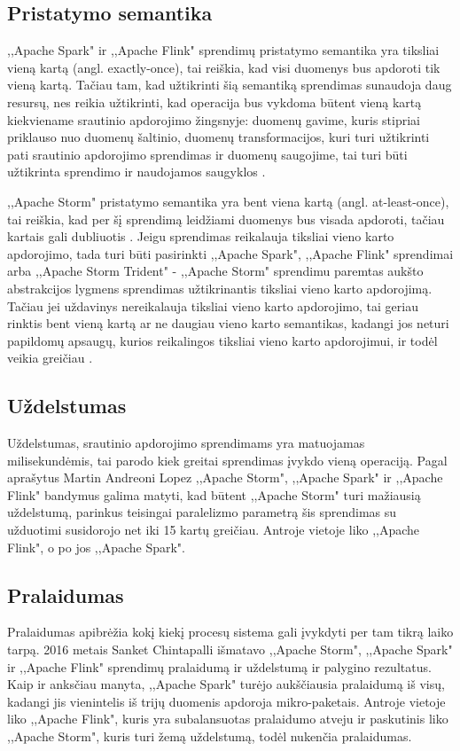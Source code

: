 \documentclass{VUMIFPSkursinis}
\begin{document}
\subsection{Pristatymo semantika}
,,Apache Spark" ir ,,Apache Flink" sprendimų pristatymo semantika yra tiksliai vieną kartą (angl. exactly-once), tai reiškia, kad visi 
duomenys bus apdoroti tik vieną kartą. Tačiau tam, kad užtikrinti šią semantiką sprendimas sunaudoja daug resursų, nes reikia užtikrinti, kad 
operacija bus vykdoma būtent vieną kartą kiekviename srautinio apdorojimo žingsnyje: duomenų gavime, kuris stipriai priklauso nuo duomenų šaltinio,
duomenų transformacijos, kuri turi užtikrinti pati srautinio apdorojimo sprendimas ir duomenų saugojime, tai turi būti užtikrinta sprendimo ir
naudojamos saugyklos \cite{zhang20}.\par
    ,,Apache Storm" pristatymo semantika yra bent viena kartą (angl. at-least-once), tai reiškia, kad per šį sprendimą leidžiami duomenys 
bus visada apdoroti, tačiau kartais gali dubliuotis \cite{prithi20}. Jeigu sprendimas reikalauja tiksliai vieno karto apdorojimo, tada turi būti pasirinkti
,,Apache Spark", ,,Apache Flink" sprendimai arba ,,Apache Storm Trident" - ,,Apache Storm" sprendimu paremtas aukšto abstrakcijos lygmens sprendimas 
užtikrinantis tiksliai vieno karto apdorojimą. Tačiau jei uždavinys nereikalauja tiksliai vieno karto apdorojimo, tai geriau
rinktis bent vieną kartą ar ne daugiau vieno karto semantikas, kadangi jos neturi papildomų apsaugų, kurios reikalingos tiksliai vieno karto apdorojimui,
ir todėl veikia greičiau \cite{zhang20}.
\subsection{Uždelstumas}
    Uždelstumas, srautinio apdorojimo sprendimams yra matuojamas milisekundėmis, tai parodo kiek greitai sprendimas įvykdo vieną operaciją. 
Pagal \cite{Lopez2016APC} aprašytus Martin Andreoni Lopez ,,Apache Storm", ,,Apache Spark" ir ,,Apache Flink" bandymus galima matyti, kad būtent ,,Apache Storm" turi mažiausią uždelstumą,
parinkus teisingai paralelizmo parametrą šis sprendimas su užduotimi susidorojo net iki 15 kartų greičiau. Antroje vietoje liko ,,Apache Flink", o po jos
,,Apache Spark".

\subsection{Pralaidumas}
Pralaidumas apibrėžia kokį kiekį procesų sistema gali įvykdyti per tam tikrą laiko tarpą. 2016 metais Sanket Chintapalli \cite{chintapalli2016benchmarking} išmatavo ,,Apache Storm",
,,Apache Spark" ir ,,Apache Flink" sprendimų pralaidumą ir uždelstumą ir palygino rezultatus. Kaip ir anksčiau manyta, ,,Apache Spark" turėjo aukščiausia 
pralaidumą iš visų, kadangi jis vienintelis iš trijų duomenis apdoroja mikro-paketais. Antroje vietoje liko ,,Apache Flink", kuris yra subalansuotas
pralaidumo atveju ir paskutinis liko ,,Apache Storm", kuris turi žemą uždelstumą, todėl nukenčia pralaidumas.
\end{document}
